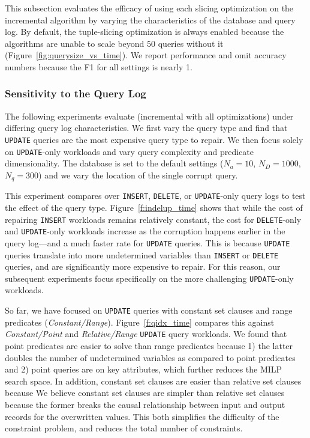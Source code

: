 This subsection evaluates the efficacy of using each slicing optimization on the incremental algorithm by varying the characteristics of the database and query log.  
By default, the tuple-slicing optimization is always enabled because the algorithms are unable to scale beyond $50$ queries without it (Figure~\ref{fig:querysize_vs_time}).
We report performance and omit accuracy numbers because the F1 for all settings is nearly 1.


\subsubsection{Sensitivity to the Query Log}
\label{sec:experiments:synth}

The following experiments evaluate \sys (incremental with all optimizations) under differing query log characteristics.
We first vary the query type and find that \texttt{UPDATE} queries are the most expensive query type to repair.
We then focus solely on \texttt{UPDATE}-only workloads and vary query complexity and predicate dimensionality.
The database is set to the default settings ($N_a=10$, $N_D=1000$, $N_q=300$) and we vary the location of the single corrupt query.

\label{sec:indelup}
This experiment compares \sys over \texttt{INSERT}, \texttt{DELETE}, or \texttt{UPDATE}-only query logs to test the effect of the query type.
Figure~\ref{f:indelup_time} shows that while the cost of repairing \texttt{INSERT} workloads
remains relatively constant, the cost for \texttt{DELETE}-only and \texttt{UPDATE}-only workloads increase as 
the corruption happens earlier in the query log---and a much faster rate for \texttt{UPDATE} queries.
This is because \texttt{UPDATE} queries translate into more undetermined variables than \texttt{INSERT} or \texttt{DELETE} queries, and are significantly more expensive to repair. 
For this reason, our subsequent experiments focus specifically on the more challenging \texttt{UPDATE}-only workloads.

\smallskip
{}
So far, we have focused on \texttt{UPDATE} queries with constant set clauses and range predicates ({\it Constant/Range}).  
Figure~\ref{f:qidx_time} compares this against {\it Constant/Point} and {\it Relative/Range} \texttt{UPDATE} query workloads. 
We found that point predicates are easier to solve than range predicates because 
1) the latter doubles the number of undetermined variables as compared to point predicates and 
2) point queries are on key attributes, which further reduces the MILP search space.
In addition, constant set clauses are easier than relative set clauses because
We believe constant set clauses are simpler than relative set clauses  because the former breaks the causal relationship between input and output records for the overwritten values.
This both simplifies the difficulty of the constraint problem, and reduces the total number of constraints.


